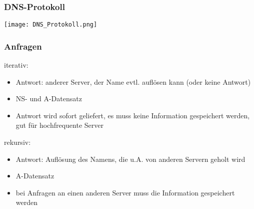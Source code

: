 		\subsubsection{DNS-Protokoll}
			\begin{center}
				\texttt{[image: DNS\_Protokoll.png]}
			\end{center}
		\subsubsection{Anfragen}
			iterativ:
			\begin{itemize}
				\item Antwort: anderer Server, der Name evtl. auflösen kann (oder keine Antwort)
				\item NS- und A-Datensatz
				\item Antwort wird sofort geliefert, es muss keine Information gespeichert werden, gut für hochfrequente Server
			\end{itemize}
			rekursiv:
			\begin{itemize}
				\item Antwort: Auflösung des Namens, die u.A. von anderen Servern geholt wird
				\item A-Datensatz
				\item bei Anfragen an einen anderen Server muss die Information gespeichert werden
			\end{itemize}






			
			
			
